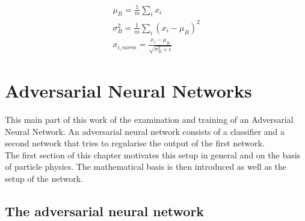 \begin{align}
    \mu_B = \frac{1}{m} \sum_i x_i\\
    \sigma_B^2 = \frac{1}{m} \sum_i (x_i - \mu_B)^2\\
    x_{i,norm} = \frac{x_i - \mu_B}{\sqrt{\sigma_B^2 + \epsilon}}
\end{align}





\section{Adversarial Neural Networks}

This main part of this work of the examination and training of an Adversarial Neural Network. An adversarial neural network consists of a classifier and a second network that tries to regularise the output of the first network.\\
The first section of this chapter motivates this setup in general and on the basis of particle physics. The mathematical basis is then introduced as well as the setup of the network. \cite{2014arXiv1406.2661G}

\subsection{The adversarial neural network}

